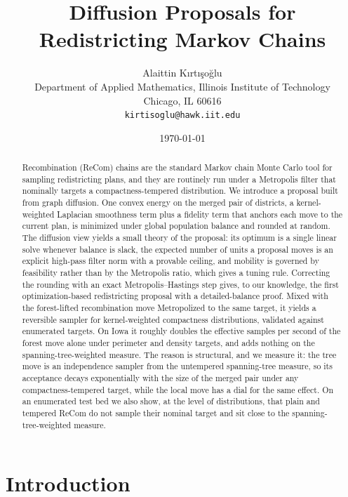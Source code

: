 \documentclass[11pt]{article}
\title{Diffusion Proposals for Redistricting Markov Chains}
\author{Alaittin K\i rt\i \c{s}o\u{g}lu \\
        \small Department of Applied Mathematics, Illinois Institute of Technology \\
        \small Chicago, IL 60616 \\
        \small \texttt{kirtisoglu@hawk.iit.edu}}
\date{\today}
\newcommand{\todo}[1]{\textcolor{red}{[#1]}}
\begin{document}
\maketitle

\begin{abstract}
Recombination (ReCom) chains are the standard Markov chain Monte Carlo
tool for sampling redistricting plans, and they are routinely run under
a Metropolis filter that nominally targets a compactness-tempered
distribution. We introduce a proposal built from graph diffusion. One
convex energy on the merged pair of districts, a kernel-weighted
Laplacian smoothness term plus a fidelity term that anchors each move to
the current plan, is minimized under global population balance and
rounded at random. The diffusion view yields a small theory of the
proposal: its optimum is a single linear solve whenever balance is
slack, the expected number of units a proposal moves is an explicit
high-pass filter norm with a provable ceiling, and mobility is governed
by feasibility rather than by the Metropolis ratio, which gives a tuning
rule. Correcting the rounding with an exact Metropolis--Hastings step
gives, to our knowledge, the first optimization-based redistricting
proposal with a detailed-balance proof. Mixed with the forest-lifted
recombination move Metropolized to the same target, it yields a
reversible sampler for kernel-weighted compactness distributions,
validated against enumerated targets. On Iowa it roughly doubles the
effective samples per second of the forest move alone under perimeter
and density targets, and adds nothing on the spanning-tree-weighted
measure. The reason is structural, and we measure it: the tree move is
an independence sampler from the untempered spanning-tree measure, so
its acceptance decays exponentially with the size of the merged pair
under any compactness-tempered target, while the local move has a dial
for the same effect. On an enumerated test bed we also show, at the
level of distributions, that plain and tempered ReCom do not sample
their nominal target and sit close to the spanning-tree-weighted
measure.
\end{abstract}


\section{Introduction}\label{sec:intro}
\end{document}
